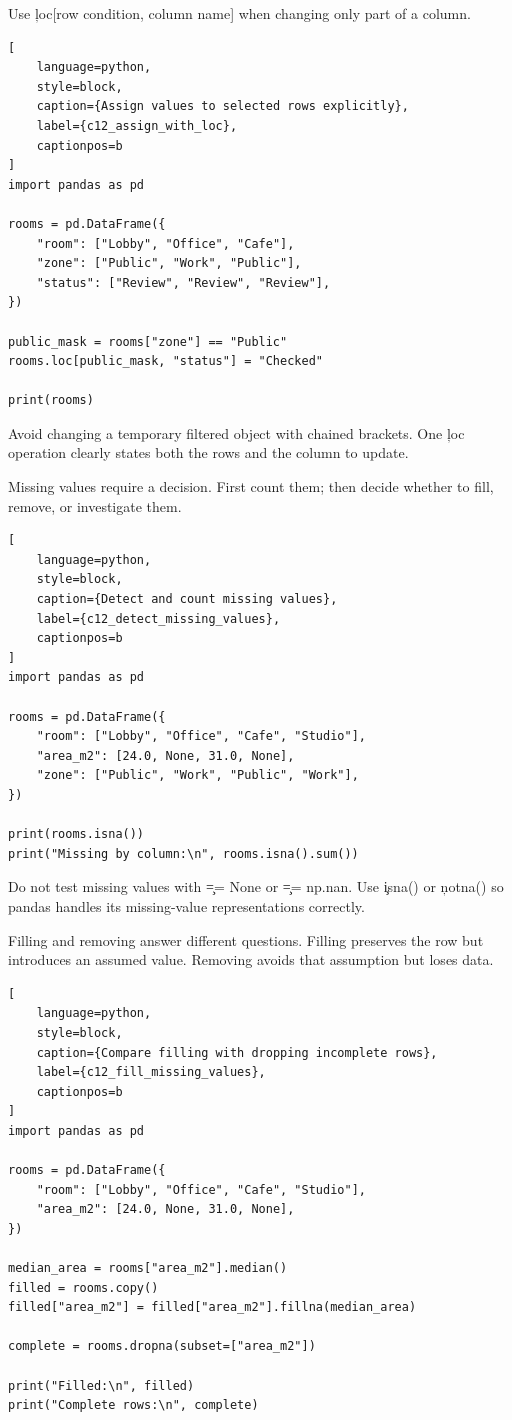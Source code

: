 
Use \c{loc[row condition, column name]} when changing only part of a column.

\begin{lstlisting}[
    language=python,
    style=block,
    caption={Assign values to selected rows explicitly},
    label={c12_assign_with_loc},
    captionpos=b
]
import pandas as pd

rooms = pd.DataFrame({
    "room": ["Lobby", "Office", "Cafe"],
    "zone": ["Public", "Work", "Public"],
    "status": ["Review", "Review", "Review"],
})

public_mask = rooms["zone"] == "Public"
rooms.loc[public_mask, "status"] = "Checked"

print(rooms)
\end{lstlisting}

Avoid changing a temporary filtered object with chained brackets. One \c{loc}
operation clearly states both the rows and the column to update.


Missing values require a decision. First count them; then decide whether to
fill, remove, or investigate them.

\begin{lstlisting}[
    language=python,
    style=block,
    caption={Detect and count missing values},
    label={c12_detect_missing_values},
    captionpos=b
]
import pandas as pd

rooms = pd.DataFrame({
    "room": ["Lobby", "Office", "Cafe", "Studio"],
    "area_m2": [24.0, None, 31.0, None],
    "zone": ["Public", "Work", "Public", "Work"],
})

print(rooms.isna())
print("Missing by column:\n", rooms.isna().sum())
\end{lstlisting}

Do not test missing values with \c{== None} or \c{== np.nan}. Use \c{isna()}
or \c{notna()} so pandas handles its missing-value representations correctly.


Filling and removing answer different questions. Filling preserves the row but
introduces an assumed value. Removing avoids that assumption but loses data.

\begin{lstlisting}[
    language=python,
    style=block,
    caption={Compare filling with dropping incomplete rows},
    label={c12_fill_missing_values},
    captionpos=b
]
import pandas as pd

rooms = pd.DataFrame({
    "room": ["Lobby", "Office", "Cafe", "Studio"],
    "area_m2": [24.0, None, 31.0, None],
})

median_area = rooms["area_m2"].median()
filled = rooms.copy()
filled["area_m2"] = filled["area_m2"].fillna(median_area)

complete = rooms.dropna(subset=["area_m2"])

print("Filled:\n", filled)
print("Complete rows:\n", complete)
\end{lstlisting}


